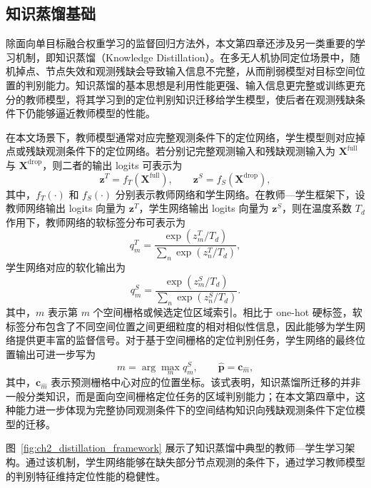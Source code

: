 \subsection{知识蒸馏基础}
\label{subsec:2_4_2}

除面向单目标融合权重学习的监督回归方法外，本文第四章还涉及另一类重要的学习机制，即知识蒸馏（Knowledge Distillation）。在多无人机协同定位场景中，随机掉点、节点失效和观测残缺会导致输入信息不完整，从而削弱模型对目标空间位置的判别能力。知识蒸馏的基本思想是利用性能更强、输入信息更完整或训练更充分的教师模型，将其学习到的定位判别知识迁移给学生模型，使后者在观测残缺条件下仍能够逼近教师模型的性能。

在本文场景下，教师模型通常对应完整观测条件下的定位网络，学生模型则对应掉点或残缺观测条件下的定位网络。若分别记完整观测输入和残缺观测输入为 $\mathbf{X}^{\mathrm{full}}$ 与 $\mathbf{X}^{\mathrm{drop}}$，则二者的输出 logits 可表示为
\begin{equation}
\mathbf{z}^{T}=f_T(\mathbf{X}^{\mathrm{full}}),
\qquad
\mathbf{z}^{S}=f_S(\mathbf{X}^{\mathrm{drop}}),
\label{eq:2_32_kd_input}
\end{equation}
其中，$f_T(\cdot)$ 和 $f_S(\cdot)$ 分别表示教师网络和学生网络。在教师—学生框架下，设教师网络输出 logits 向量为 $\mathbf{z}^{T}$，学生网络输出 logits 向量为 $\mathbf{z}^{S}$，则在温度系数 $T_d$ 作用下，教师网络的软标签分布可表示为
\begin{equation}
q^{T}_{m}
=
\frac{\exp(z^{T}_{m}/T_d)}
{\sum_{n}\exp(z^{T}_{n}/T_d)},
\label{eq:2_32_teacher_soft}
\end{equation}
学生网络对应的软化输出为
\begin{equation}
q^{S}_{m}
=
\frac{\exp(z^{S}_{m}/T_d)}
{\sum_{n}\exp(z^{S}_{n}/T_d)}.
\label{eq:2_33_student_soft}
\end{equation}
其中，$m$ 表示第 $m$ 个空间栅格或候选定位区域索引。相比于 one-hot 硬标签，软标签分布包含了不同空间位置之间更细粒度的相对相似性信息，因此能够为学生网络提供更丰富的监督信号\cite{Hinton2015KD}。对于基于空间栅格的定位判别任务，学生网络的最终位置输出可进一步写为
\begin{equation}
\hat{m}
=
\arg\max_m q_m^S,
\qquad
\hat{\mathbf{p}}
=
\mathbf{c}_{\hat{m}},
\label{eq:2_34_kd_position}
\end{equation}
其中，$\mathbf{c}_{\hat{m}}$ 表示预测栅格中心对应的位置坐标。该式表明，知识蒸馏所迁移的并非一般分类知识，而是面向空间栅格定位任务的区域判别能力；在本文第四章中，这种能力进一步体现为完整协同观测条件下的空间结构知识向残缺观测条件下定位模型的迁移。

图~\ref{fig:ch2_distillation_framework} 展示了知识蒸馏中典型的教师—学生学习架构。通过该机制，学生网络能够在缺失部分节点观测的条件下，通过学习教师模型的判别特征维持定位性能的稳健性。


